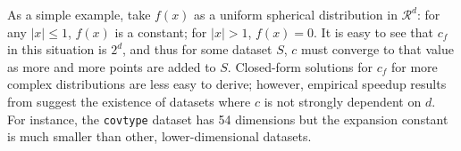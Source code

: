 As a simple example, take $f(x)$ as a uniform spherical distribution in
$\mathcal{R}^d$: for any $|x| \le 1$, $f(x)$ is a constant; for $|x| > 1$, $f(x)
= 0$.  It is easy to see that $c_f$ in this situation is $2^d$, and thus for
some dataset $S$, $c$ must converge to that value as more and more points are
added to $S$.  Closed-form solutions for $c_f$ for more complex distributions
are less easy to derive; however, empirical speedup results from
\citet{langford2006} suggest the existence of datasets where $c$ is not strongly
dependent on $d$.  For instance, the \texttt{covtype} dataset has 54 dimensions
but the expansion constant is much smaller than other, lower-dimensional
datasets.




